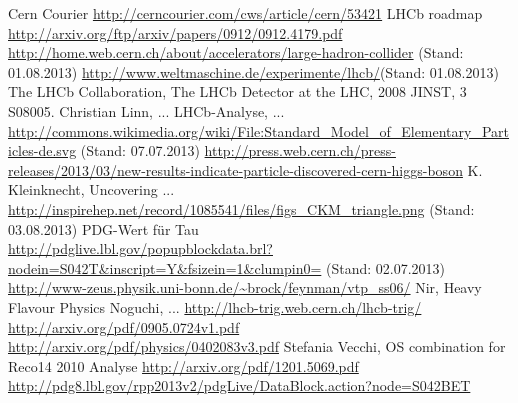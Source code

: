 \documentclass[a4paper]{scrbook}
\begin{document}

\tableofcontents









\begin{thebibliography}{---}
 Cern Courier \url{http://cerncourier.com/cws/article/cern/53421}
 LHCb roadmap \url{http://arxiv.org/ftp/arxiv/papers/0912/0912.4179.pdf}
 \url{http://home.web.cern.ch/about/accelerators/large-hadron-collider} (Stand: 01.08.2013)
 \url{http://www.weltmaschine.de/experimente/lhcb/}(Stand: 01.08.2013)
 The LHCb Collaboration, The LHCb Detector at the LHC, 2008 JINST, 3 S08005.
 Christian Linn, ...
 LHCb-Analyse, ...
 \url{http://commons.wikimedia.org/wiki/File:Standard_Model_of_Elementary_Particles-de.svg} (Stand: 07.07.2013)
 \url{http://press.web.cern.ch/press-releases/2013/03/new-results-indicate-particle-discovered-cern-higgs-boson}
  K. Kleinknecht, Uncovering ...
 \url{http://inspirehep.net/record/1085541/files/figs_CKM_triangle.png} (Stand: 03.08.2013)
 PDG-Wert für Tau \\ \url{http://pdglive.lbl.gov/popupblockdata.brl?nodein=S042T&inscript=Y&fsizein=1&clumpin0=} (Stand: 02.07.2013)
 \url{http://www-zeus.physik.uni-bonn.de/~brock/feynman/vtp_ss06/}
 Nir, Heavy Flavour Physics
 Noguchi, ...
 \url{http://lhcb-trig.web.cern.ch/lhcb-trig/}
 \url{http://arxiv.org/pdf/0905.0724v1.pdf}
 \url{http://arxiv.org/pdf/physics/0402083v3.pdf}
 Stefania Vecchi, OS combination for Reco14
 2010 Analyse
 \url{http://arxiv.org/pdf/1201.5069.pdf}
 \url{http://pdg8.lbl.gov/rpp2013v2/pdgLive/DataBlock.action?node=S042BET}
\end{thebibliography}


\end{document}
